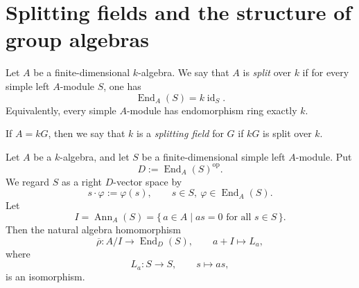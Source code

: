 \section{Splitting fields and the structure of group algebras}
\begin{definition}
    Let \(A\) be a finite-dimensional \(k\)-algebra. We say that \(A\) is
    \emph{split} over \(k\) if for every simple left \(A\)-module \(S\), one has
    \[
        \operatorname{End}_A(S)=k\operatorname{id}_S.
    \]
    Equivalently, every simple \(A\)-module has endomorphism ring exactly \(k\).

    If \(A=kG\), then we say that \(k\) is a \emph{splitting field} for \(G\) if
    \(kG\) is split over \(k\).
\end{definition}

\begin{theorem}\label{thm:finite-dimensional-density}
    Let \(A\) be a \(k\)-algebra, and let \(S\) be a finite-dimensional simple
    left \(A\)-module. Put
    \[
        D:=\operatorname{End}_A(S)^{\operatorname{op}}.
    \]
    We regard \(S\) as a right \(D\)-vector space by
    \[
        s\cdot \varphi := \varphi(s),
        \qquad
        s\in S,\ \varphi\in \operatorname{End}_A(S).
    \]
    Let
    \[
        I=\operatorname{Ann}_A(S)
        =
        \{\,a\in A\mid as=0\text{ for all }s\in S\,\}.
    \]
    Then the natural algebra homomorphism
    \[
        \overline{\rho}:A/I\longrightarrow \operatorname{End}_D(S),
        \qquad
        a+I\longmapsto L_a,
    \]
    where
    \[
        L_a:S\longrightarrow S,\qquad s\longmapsto as,
    \]
    is an isomorphism.
\end{theorem}

